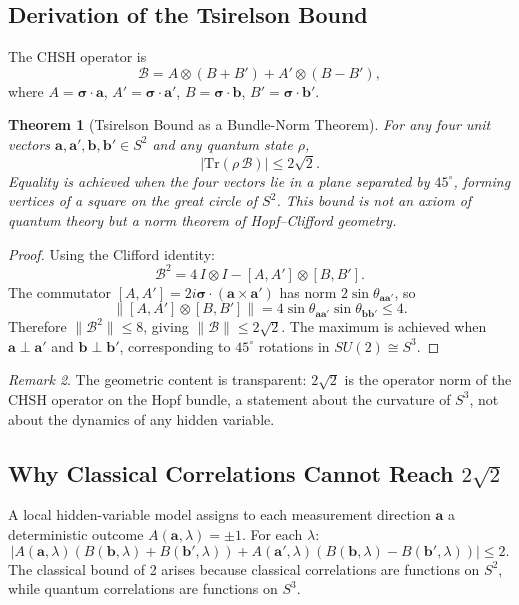 \documentclass[12pt,a4paper]{article}
\newtheorem{theorem}{Theorem}[section]
\theoremstyle{definition}
\theoremstyle{remark}
\newtheorem{remark}[theorem]{Remark}
\begin{document}
\subsection{Derivation of the Tsirelson Bound}

The CHSH operator is
\[
\mathcal{B} = A\otimes(B+B') + A'\otimes(B-B'),
\]
where $A=\boldsymbol{\sigma}\cdot\mathbf{a}$, $A'=\boldsymbol{\sigma}\cdot\mathbf{a}'$,
$B=\boldsymbol{\sigma}\cdot\mathbf{b}$, $B'=\boldsymbol{\sigma}\cdot\mathbf{b}'$.

\begin{theorem}[Tsirelson Bound as a Bundle-Norm Theorem]
For any four unit vectors $\mathbf{a},\mathbf{a}',\mathbf{b},\mathbf{b}'\in S^2$
and any quantum state $\rho$,
\[
|\mathrm{Tr}(\rho\,\mathcal{B})| \leq 2\sqrt{2}.
\]
Equality is achieved when the four vectors lie in a plane separated by $45^\circ$,
forming vertices of a square on the great circle of $S^2$. This bound is not an
axiom of quantum theory but a norm theorem of Hopf--Clifford geometry.
\end{theorem}

\begin{proof}
Using the Clifford identity:
\[
\mathcal{B}^2 = 4\,I\otimes I - [A,A']\otimes[B,B'].
\]
The commutator $[A,A'] = 2i\boldsymbol{\sigma}\cdot(\mathbf{a}\times\mathbf{a}')$
has norm $2\sin\theta_{\mathbf{a}\mathbf{a}'}$, so
\[
\|[A,A']\otimes[B,B']\| = 4\sin\theta_{\mathbf{a}\mathbf{a}'}\sin\theta_{\mathbf{b}\mathbf{b}'} \leq 4.
\]
Therefore $\|\mathcal{B}^2\| \leq 8$, giving $\|\mathcal{B}\| \leq 2\sqrt{2}$. The
maximum is achieved when $\mathbf{a}\perp\mathbf{a}'$ and $\mathbf{b}\perp\mathbf{b}'$,
corresponding to $45^\circ$ rotations in $SU(2)\cong S^3$.
\end{proof}

\begin{remark}
The geometric content is transparent: $2\sqrt{2}$ is the operator norm of the CHSH
operator on the Hopf bundle, a statement about the curvature of $S^3$, not about
the dynamics of any hidden variable.
\end{remark}

\subsection{Why Classical Correlations Cannot Reach $2\sqrt{2}$}

A local hidden-variable model assigns to each measurement direction $\mathbf{a}$ a
deterministic outcome $A(\mathbf{a},\lambda)=\pm 1$. For each $\lambda$:
\[
|A(\mathbf{a},\lambda)(B(\mathbf{b},\lambda)+B(\mathbf{b}',\lambda))
+ A(\mathbf{a}',\lambda)(B(\mathbf{b},\lambda)-B(\mathbf{b}',\lambda))| \leq 2.
\]
The classical bound of 2 arises because classical correlations are functions on $S^2$,
while quantum correlations are functions on $S^3$.
\end{document}

